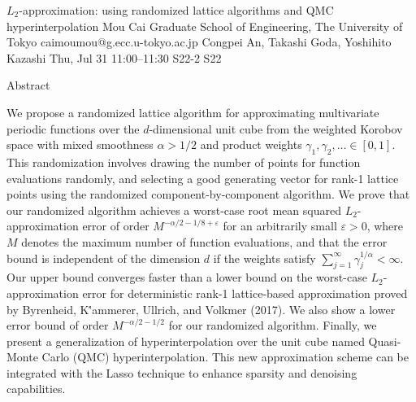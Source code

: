 \begin{talk}
  {$L_2$-approximation: using randomized lattice algorithms and QMC hyperinterpolation}%
  {Mou Cai}%
  {Graduate School of Engineering, The University of Tokyo}%
  {caimoumou@g.ecc.u-tokyo.ac.jp}%
  {Congpei An, Takashi Goda, Yoshihito Kazashi}%
  {}%
  {Thu, Jul 31 11:00–11:30}%
  {S22-2}%
  {S22}%
  
				
Abstract

			
We propose a randomized lattice algorithm for approximating multivariate periodic functions over the $d$-dimensional unit cube from the weighted Korobov space with mixed smoothness $\alpha > 1/2$ and product weights $\gamma_1,\gamma_2,\ldots\in [0,1]$. This randomization involves drawing the number of points for function evaluations randomly, and selecting a good generating vector for rank-1 lattice points using the randomized component-by-component algorithm. We prove that our randomized algorithm achieves a worst-case root mean squared $L_2$-approximation error of order $M^{-\alpha/2 - 1/8 + \varepsilon}$ for an arbitrarily small $\varepsilon > 0$, where $M$ denotes the maximum number of function evaluations, and that the error bound is independent of the dimension $d$ if the weights satisfy $\sum_{j=1}^\infty \gamma_j^{1/\alpha} < \infty$. Our upper bound converges faster than a lower bound on the worst-case $L_2$-approximation error for deterministic rank-1 lattice-based approximation proved by Byrenheid, K\''{a}mmerer, Ullrich, and Volkmer (2017). We also show a lower error bound of order $M^{-\alpha/2-1/2}$ for our randomized algorithm. Finally, we present a generalization of hyperinterpolation over the unit cube named Quasi-Monte Carlo (QMC) hyperinterpolation. This new approximation scheme can be integrated with the Lasso technique to enhance sparsity and denoising capabilities.

\medskip


\end{talk}

